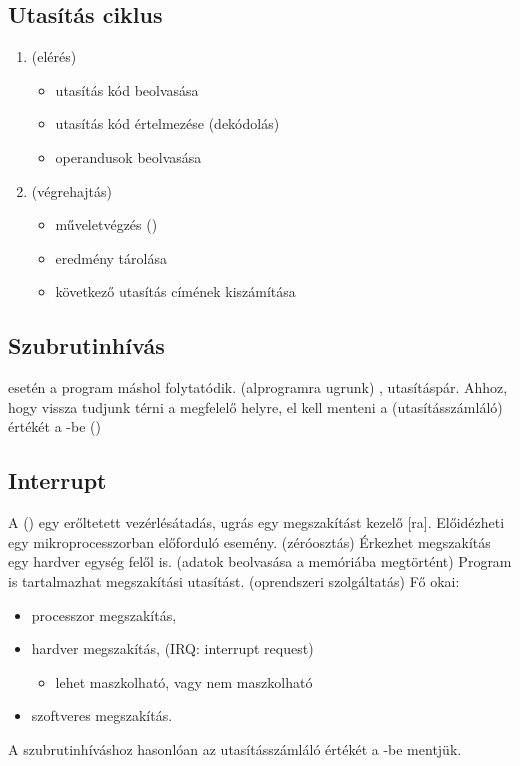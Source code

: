 \documentclass[../main.tex]{subfiles}
\begin{document}
\subsection{Utasítás ciklus}

\begin{enumerate}
	\item {} (elérés)
	      \begin{itemize}
		      \item utasítás kód beolvasása
		      \item utasítás kód értelmezése (dekódolás)
		      \item operandusok beolvasása
	      \end{itemize}
	\item {} (végrehajtás)
	      \begin{itemize}
		      \item műveletvégzés ()
		      \item eredmény tárolása
		      \item következő utasítás címének kiszámítása
	      \end{itemize}
\end{enumerate}

\subsection{Szubrutinhívás}

 esetén a program máshol folytatódik. (alprogramra ugrunk)
,  utasításpár. Ahhoz, hogy vissza tudjunk térni a megfelelő
helyre, el kell menteni a  (utasításszámláló) értékét a -be
()

\subsection{Interrupt}

A  () egy erőltetett vezérlésátadás,
ugrás egy megszakítást kezelő [ra]. Előidézheti egy
mikroprocesszorban előforduló esemény. (zéróosztás)
Érkezhet megszakítás egy hardver egység felől is. (adatok beolvasása a
memóriába megtörtént) Program is tartalmazhat megszakítási utasítást.
(oprendszeri szolgáltatás) Fő okai:
\begin{itemize}
	\item processzor megszakítás,
	\item hardver megszakítás, (IRQ: interrupt request)
	      \begin{itemize}
		      \item lehet maszkolható, vagy nem maszkolható
	      \end{itemize}
	\item szoftveres megszakítás.
\end{itemize}
A szubrutinhíváshoz hasonlóan az utasításszámláló értékét a -be
mentjük.
\end{document}
